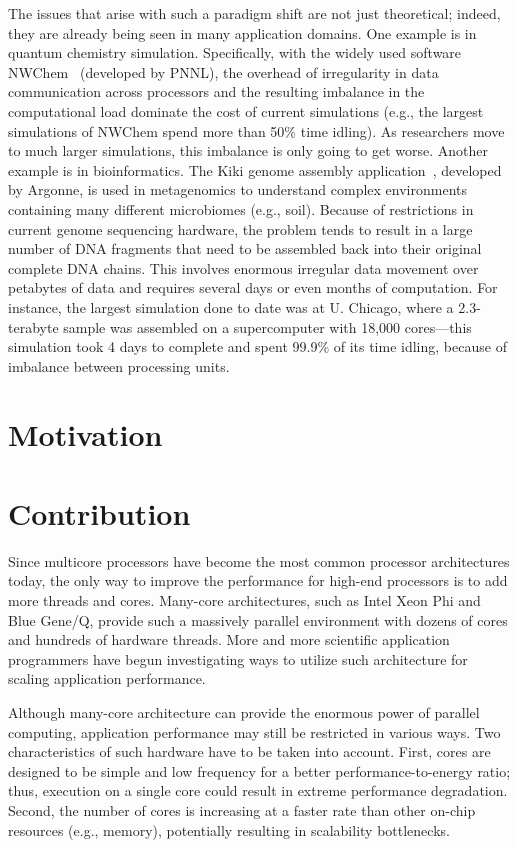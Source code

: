 The issues that arise with such a paradigm shift are not just
theoretical; indeed, they are already being seen in many application
domains.  One example is in quantum chemistry simulation.
Specifically, with the widely used software NWChem~\cite{nwchem}
(developed by PNNL), the overhead of irregularity in data
communication across processors and the resulting imbalance in the
computational load dominate the cost of current simulations (e.g., the
largest simulations of NWChem spend more than 50\% time idling).  As
researchers move to much larger simulations, this imbalance is only
going to get worse.  Another example is in bioinformatics.  The Kiki
genome assembly application~\cite{kiki}, developed by Argonne, is used
in metagenomics to understand complex environments containing many
different microbiomes (e.g., soil).  Because of restrictions in
current genome sequencing hardware, the problem tends to result in a
large number of DNA fragments that need to be assembled back into
their original complete DNA chains.  This involves enormous irregular
data movement over petabytes of data and requires several days or even
months of computation.  For instance, the largest simulation done to
date was at U. Chicago, where a 2.3-terabyte sample was assembled on a
supercomputer with 18,000 cores---this simulation took 4 days to
complete and spent 99.9\% of its time idling, because of imbalance
between processing units.

\section{Motivation}
\section{Contribution}

Since multicore processors have become the most common processor
architectures today, the only way to improve the performance for
high-end processors is to add more threads and cores. Many-core
architectures, such as Intel Xeon Phi and Blue Gene/Q, provide such a
massively parallel environment with dozens of cores and hundreds of
hardware threads. More and more scientific application programmers
have begun investigating ways to utilize such architecture for scaling
application performance.

Although many-core architecture can provide the enormous power of
parallel computing, application performance may still be restricted in
various ways. Two characteristics of such hardware have to be taken
into account. First, cores are designed to be simple and low frequency
for a better performance-to-energy ratio; thus, execution on a single
core could result in extreme performance degradation. Second, the
number of cores is increasing at a faster rate than other on-chip
resources (e.g., memory), potentially resulting in scalability
bottlenecks.

